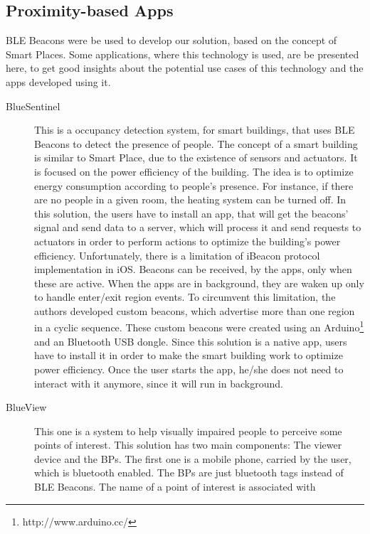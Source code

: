 \subsection{Proximity-based Apps}
\label{sub:background_ble_beacons_applications}
\gls{BLE} Beacons were
be used to develop our solution, based on the concept of Smart Places.
Some
applications, where this technology is used,
are be presented here, to
get good insights about the potential use cases of this
technology and the apps developed using it.
\begin{description}
  \item[BlueSentinel\cite{Conte2014}]
  This is a
  occupancy detection system, for smart buildings,
  that uses \gls{BLE} Beacons to detect the presence of
  people. The concept of a smart building
  is similar to Smart Place,
  due to the existence of sensors and actuators.
  It is focused on the power efficiency of the
  building. The idea is to optimize energy
  consumption according to people's presence.
  For instance, if there are no people in a given room,
  the heating system can be turned off.
  In this solution, the users have to install
  an app, that will get the beacons' signal and
  send data to a server, which will process it
  and send requests to actuators in order to
  perform actions to optimize the
  building's power efficiency.
  Unfortunately, there is a limitation
  of iBeacon protocol implementation
  in iOS.
  Beacons can be received, by the apps,
  only when these are active. When the apps are in
  background, they are waken up only to handle
  enter/exit region events. To circumvent this
  limitation, the authors developed custom
  beacons, which advertise more than one region
  in a cyclic sequence. These custom beacons
  were created using an
  Arduino\footnote{http://www.arduino.cc/}
  and an Bluetooth \gls{USB} dongle.
  Since this solution is a native app,
  users have to install it in order
  to make the smart building work to
  optimize power efficiency.
  Once the user starts the app, he/she does not
  need to interact with it anymore, since it
  will run in background.
  \item[BlueView\cite{Chen2013}]
  This one is a system to help
  visually impaired people to perceive some points of interest.
  This solution has two main components: The viewer device
  and the \glspl{BP}. The first one is a mobile phone,
  carried by the user, which is bluetooth enabled.
  The \glspl{BP} are just bluetooth tags instead of
  \gls{BLE} Beacons. The name of a point of interest is associated with

\end{description}
